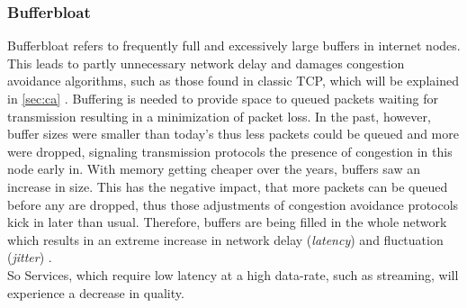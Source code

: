 \documentclass[a4paper,conference]{IEEEtran}
\begin{document}
\subsubsection*{Bufferbloat}
Bufferbloat refers to frequently full and excessively large buffers in internet nodes. This leads to partly unnecessary network delay and damages congestion avoidance algorithms, such as those found in classic TCP, which will be explained in  \autoref{sec:ca} \cite{gettys2012bufferbloat,chen2014bufferbloat}. Buffering is needed to provide space to queued packets waiting for transmission resulting in a minimization of packet loss. In the past, however, buffer sizes were smaller than today's thus less packets could be queued and more were dropped, signaling transmission protocols the presence of congestion in this node early in. With memory getting cheaper over the years, buffers saw an increase in size. This has the negative impact, that more packets can be queued before any are dropped, thus those adjustments of congestion avoidance protocols kick in later than usual. Therefore, buffers are being filled in the whole network which results in an extreme increase in network delay (\textit{latency}) and fluctuation (\textit{jitter}) \cite{gettys2012bufferbloat,staff2012bufferbloat,chen2014bufferbloat}.
\\So Services, which require low latency at a high data-rate, such as streaming, will experience a decrease in quality.
\end{document}

